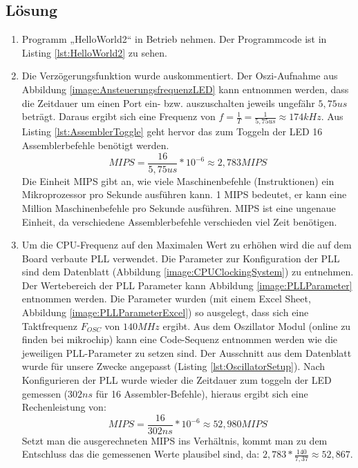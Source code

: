 \subsection{Lösung}
\begin{enumerate}
		\item Programm „HelloWorld2“ in Betrieb nehmen. Der Programmcode ist in Listing \ref{lst:HelloWorld2} zu sehen.
		\item Die Verzögerungsfunktion wurde auskommentiert. Der Oszi-Aufnahme aus Abbildung \ref{image:AnsteuerungsfrequenzLED} kann entnommen werden, dass die Zeitdauer um einen Port ein- bzw. auszuschalten jeweils ungefähr $5,75us$ beträgt. Daraus ergibt sich eine Frequenz von $f=\frac{1}{T}=\frac{1}{5,75us}≈174kHz$. Aus Listing \ref{lst:AssemblerToggle} geht hervor das zum Toggeln der LED 16 Assemblerbefehle benötigt werden.
		\begin{equation}
		\label{eq:MIPS}
		MIPS=\frac{16}{5,75us}*10^{-6}≈2,783  MIPS
		\end{equation}
		Die Einheit MIPS gibt an, wie viele Maschinenbefehle (Instruktionen) ein Mikroprozessor pro Sekunde ausführen kann. 1 MIPS bedeutet, er kann eine Million Maschinenbefehle pro Sekunde ausführen. MIPS ist eine ungenaue Einheit, da verschiedene Assemblerbefehle verschieden viel Zeit benötigen.
		\item Um die CPU-Frequenz auf den Maximalen Wert zu erhöhen wird die auf dem Board verbaute PLL verwendet. Die Parameter zur Konfiguration der PLL sind dem Datenblatt (Abbildung \ref{image:CPUClockingSystem}) zu entnehmen. Der Wertebereich der PLL Parameter kann Abbildung \ref{image:PLLParameter} entnommen werden. Die Parameter wurden (mit einem Excel Sheet, Abbildung \ref{image:PLLParameterExcel}) so ausgelegt, dass sich eine Taktfrequenz $F_{OSC}$ von $140 MHz$ ergibt. Aus dem Oszillator Modul (online zu finden bei mikrochip) kann eine Code-Sequenz entnommen werden wie die jeweiligen PLL-Parameter zu setzen sind. Der Ausschnitt aus dem Datenblatt wurde für unsere Zwecke angepasst (Listing \ref{lst:OscillatorSetup}).\newline		
		Nach Konfigurieren der PLL wurde wieder die Zeitdauer zum toggeln der LED gemessen ($302ns$ für 16 Assembler-Befehle), hieraus ergibt sich eine Rechenleistung von:
		\begin{equation}
		\label{eq:MIPS_140MHz}
		MIPS=\frac{16}{302ns}*10^{-6}≈52,980  MIPS
		\end{equation}
		Setzt man die ausgerechneten MIPS ins Verhältnis, kommt man zu dem Entschluss das die gemessenen Werte plausibel sind, da: $2,783*\frac{140}{7,37}≈52,867 $.
		
		
\end{enumerate}

